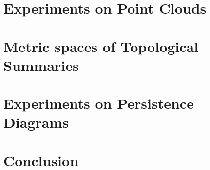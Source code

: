 \documentclass[10pt]{article}
\begin{document}
\section{Experiments on Point Clouds}
\label{sec:experiments_point_cloud}

\section{Metric spaces of Topological Summaries}
\label{sec:metric_spaces_top_summaries}

\section{Experiments on Persistence Diagrams}
\label{sec:experiments_persistence_diagrams}

\section{Conclusion}
\label{sec:conclusion}




\end{document}
